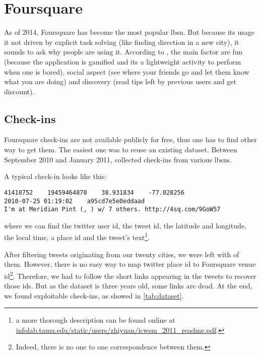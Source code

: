 \section{Foursquare}

As of 2014, Foursquare has become the most popular \gls{lbsn}. But because
its usage it not driven by explicit task solving (like finding direction in a
new city), it sounds to ask why people are using it. According to
\textcite{FSMotivation11}, the main factor are fun (because the application is
gamified and its a lightweight activity to perform when one is bored), social
aspect (see where your friends go and let them know what you are doing) and
discovery (read tips left by previous users and get discount).

\subsection{Check-ins}

Foursquare check-ins are not available publicly for free, thus one has to
find other way to get them. The easiest one was to reuse an existing dataset.
Between September 2010 and January 2011, \textcite{dataset11} collected
 check-ins from various \glspl{lbsn}.

A typical check-in looks like this:
\begin{verbatim}
41418752    19459464870    38.931834    -77.028256
2010-07-25 01:19:02    a95cd7e5e0eddaad
I'm at Meridian Pint (, ) w/ 7 others. http://4sq.com/9GoW57
\end{verbatim}

where we can find the twitter user id, the tweet id, the latitude and
longitude, the local time, a place id and the tweet's text\footnote{a more
thorough description can be found online
at \href{http://infolab.tamu.edu/static/users/zhiyuan/icwsm\_2011\_readme.pdf}%
{\url{infolab.tamu.edu/static/users/zhiyuan/icwsm_2011_readme.pdf}}.}.

After filtering tweets originating from our twenty cities, we were left with
 of them. However, there is no easy way to map twitter place
id to Foursquare venue id\footnote{Indeed, there is no one to one
correspondence between them.}. Therefore, we had to follow the short links
appearing in the tweets to recover those ids. But as the dataset is three
years old, some links are dead. At the end, we found 
exploitable check-ins, as showed in \autoref{tab:dataset}.

\medskip

